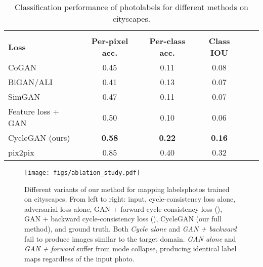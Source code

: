 \documentclass[10pt,twocolumn,letterpaper]{article}
\newcommand{\lblfig}[1]{\label{fig:#1}}
\newcommand{\lbltbl}[1]{\label{tbl:#1}}
\begin{document}
\begin{table}
\centering
\scalebox{0.75} {
\begin{tabular}{lccccc}
 & & & \\
\textbf{Loss} & \textbf{Per-pixel acc.} & \textbf{Per-class acc.} & \textbf{Class IOU} \\ \hline
CoGAN~\cite{liu2016coupled} & 0.45 & 0.11 & 0.08\\
BiGAN/ALI~\cite{dumoulin2016adversarially,donahue2016adversarial} & 0.41 & 0.13 & 0.07 \\
SimGAN~\cite{shrivastava2016learning} & 0.47 & 0.11 & 0.07\\
Feature loss + GAN & 0.50  & 0.10 & 0.06 \\
CycleGAN (ours) & {\bf 0.58} & {\bf 0.22} & {\bf 0.16}\\\hline
pix2pix~\cite{isola2016image} & 0.85 & 0.40 & 0.32 \\
\end{tabular} }
\vspace{-0.1in}
\caption {Classification performance of photolabels for different methods on cityscapes.}
\vspace{-0.1in}
\lbltbl{image_to_labels_results}
\end{table}


\begin{figure*}[ht]
\begin{center}
\texttt{[image: figs/ablation\_study.pdf]}
\end{center}
 \vspace{-5 mm}
 \caption{Different variants of our method for mapping labelsphotos trained on cityscapes. From left to right: input, cycle-consistency loss alone, adversarial loss alone, GAN + forward cycle-consistency loss (), GAN + backward cycle-consistency loss (), CycleGAN (our full method), and ground truth. Both  \emph{Cycle alone} and \emph{GAN + backward} fail to produce images similar to the target domain. \emph{GAN alone} and \emph{GAN + forward} suffer from mode collapse, producing identical label maps regardless of the input photo.} 
\lblfig{ablation} 
 \vspace{-5 mm}
\end{figure*}
\end{document}
